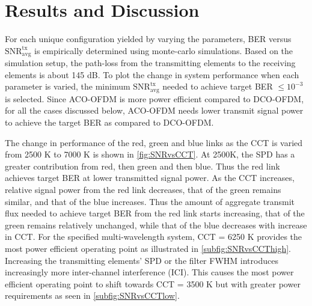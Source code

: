 \section{Results and Discussion}\label{sec:results}
For each unique configuration yielded by varying the parameters, BER versus $\text{SNR}^{\text{tx}}_{\text{avg}}$ is empirically determined using monte-carlo simulations. Based on the simulation setup, the path-loss from the transmitting elements to the receiving elements is about 145 dB. To plot the change in system performance when each parameter is varied, the minimum $\text{SNR}^{\text{tx}}_{\text{avg}}$ needed to achieve target BER $\leq 10^{-3}$ is selected. Since ACO-OFDM is more power efficient compared to DCO-OFDM, for all the cases discussed below, ACO-OFDM needs lower transmit signal power to achieve the target BER as compared to DCO-OFDM.



The change in performance of the red, green and blue links as the CCT is varied from 2500 K to 7000 K is shown in \figurename{\ref{fig:SNRvsCCT}}. At 2500K, the SPD has a greater contribution from red, then green and then blue. Thus the red link achieves target BER at lower transmitted signal power. As the CCT increases, relative signal power from the red link decreases, that of the green remains similar, and that of the blue increases. Thus the amount of aggregate transmit flux needed to achieve target BER from the red link starts increasing, that of the green remains relatively unchanged, while that of the blue decreases with increase in CCT. For the specified multi-wavelength system, CCT = 6250 K provides the most power efficient operating point as illustrated in \figurename{\ref{subfig:SNRvsCCThigh}}. Increasing the transmitting elements' SPD or the filter FWHM introduces increasingly more inter-channel interference (ICI). This causes the most power efficient operating point to shift towards CCT = 3500 K but with greater power requirements as seen in \figurename{\ref{subfig:SNRvsCCTlow}}.


